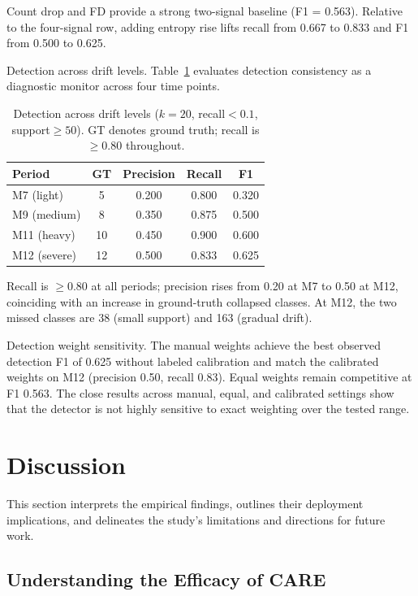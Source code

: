 \documentclass[preprint,12pt,authoryear]{elsarticle}
\newcommand{\ours}{CARE}  %
\begin{document}
Count drop and FD provide a strong two-signal baseline (F1 = 0.563). Relative to the four-signal row, adding entropy rise lifts recall from 0.667 to 0.833 and F1 from 0.500 to 0.625.

Detection across drift levels.
Table~\ref{tab:trigger} evaluates detection consistency as a diagnostic monitor across four time points.

\begin{table}[!htbp]
\centering
\caption{Detection across drift levels ($k{=}20$, recall${<}0.1$, support${\geq}50$). GT denotes ground truth; recall is $\geq$0.80 throughout.}
\label{tab:trigger}
\small
\begin{tabular}{@{}l cccc@{}}
\toprule
Period & GT & Precision & Recall & F1 \\
\midrule
M7 (light)   & 5  & 0.200 & 0.800 & 0.320 \\
M9 (medium)  & 8  & 0.350 & 0.875 & 0.500 \\
M11 (heavy)  & 10 & 0.450 & 0.900 & 0.600 \\
M12 (severe) & 12 & 0.500 & 0.833 & 0.625 \\
\bottomrule
\end{tabular}
\end{table}

Recall is $\geq$0.80 at all periods; precision rises from 0.20 at M7 to 0.50 at M12, coinciding with an increase in ground-truth collapsed classes.
At M12, the two missed classes are 38 (small support) and 163 (gradual drift).

Detection weight sensitivity.
The manual weights achieve the best observed detection F1 of 0.625 without labeled calibration and match the calibrated weights on M12 (precision 0.50, recall 0.83). Equal weights remain competitive at F1 0.563. The close results across manual, equal, and calibrated settings show that the detector is not highly sensitive to exact weighting over the tested range.

\section{Discussion}
\label{sec:discussion}

This section interprets the empirical findings, outlines their deployment implications, and delineates the study's limitations and directions for future work.

\subsection{Understanding the Efficacy of \ours{}}
\label{sec:discussion_efficacy}
\end{document}
